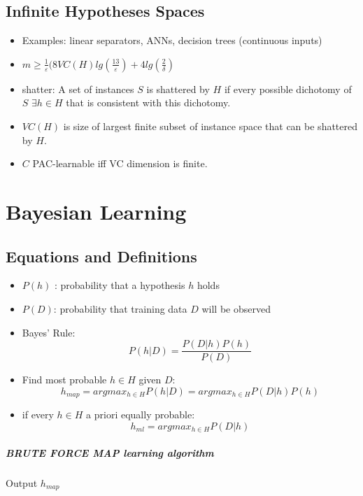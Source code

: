 \documentclass[titlepage,11pt]{article}
\begin{document}
\subsection{Infinite Hypotheses Spaces}
\begin{itemize}
\item Examples: linear separators, ANNs, decision trees (continuous inputs)
\item $m \geq \frac{1}{\varepsilon} (8VC(H)lg(\frac{13}{\varepsilon}) + 4 lg( \frac{2}{\delta})$
\item shatter: A set of instances $S$ is shattered by $H$ if every possible dichotomy of $S$ $\exists h \in H$ that is consistent with this dichotomy.
\item $VC(H)$ is size of largest finite subset of instance space that can be shattered by $H$.
\item $C$ PAC-learnable iff VC dimension is finite.
\end{itemize}


\section{Bayesian Learning}
\subsection{Equations and Definitions}
\begin{itemize}
\item $P(h)$ : probability that a hypothesis $h$ holds
\item $P(D)$: probability that training data $D$ will be observed
\item Bayes' Rule: $$P(h|D) = \frac{P(D|h)P(h)}{P(D)}$$
\item Find most probable $h \in H$ given $D$: $$h_{map} = argmax_{h \in H} P(h|D) = argmax_{h \in H} P(D|h)P(h)$$
\item if every $h\in H$ a priori equally probable: $$h_{ml} = argmax_{h \in H} P(D|h)$$
\end{itemize}

\subparagraph{BRUTE FORCE MAP learning algorithm}
Output $h_{map}$
\end{document}
